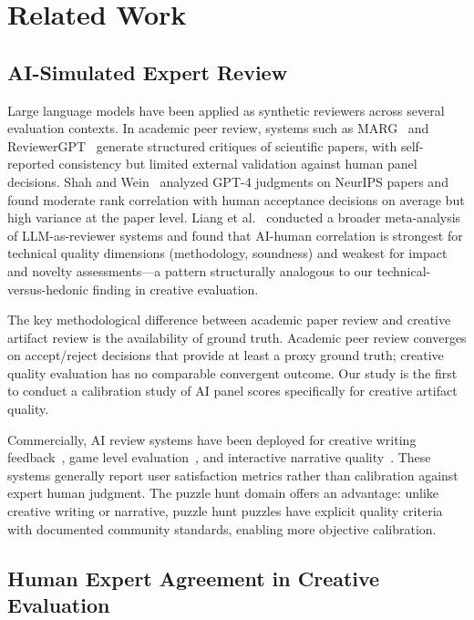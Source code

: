 \section{Related Work}
\label{sec:related}

\subsection{AI-Simulated Expert Review}

Large language models have been applied as synthetic reviewers across several evaluation contexts. In academic peer review, systems such as MARG~\cite{darcy2024marg} and ReviewerGPT~\cite{liu2023reviewergpt} generate structured critiques of scientific papers, with self-reported consistency but limited external validation against human panel decisions. Shah and Wein~\cite{shah2023ai} analyzed GPT-4 judgments on NeurIPS papers and found moderate rank correlation with human acceptance decisions on average but high variance at the paper level. Liang et al.~\cite{liang2024can} conducted a broader meta-analysis of LLM-as-reviewer systems and found that AI-human correlation is strongest for technical quality dimensions (methodology, soundness) and weakest for impact and novelty assessments---a pattern structurally analogous to our technical-versus-hedonic finding in creative evaluation.

The key methodological difference between academic paper review and creative artifact review is the availability of ground truth. Academic peer review converges on accept/reject decisions that provide at least a proxy ground truth; creative quality evaluation has no comparable convergent outcome. Our study is the first to conduct a calibration study of AI panel scores specifically for creative artifact quality.

Commercially, AI review systems have been deployed for creative writing feedback~\cite{gero2023sparks}, game level evaluation~\cite{charity2020mech}, and interactive narrative quality~\cite{zhu2023calypso}. These systems generally report user satisfaction metrics rather than calibration against expert human judgment. The puzzle hunt domain offers an advantage: unlike creative writing or narrative, puzzle hunt puzzles have explicit quality criteria with documented community standards, enabling more objective calibration.

\subsection{Human Expert Agreement in Creative Evaluation}

